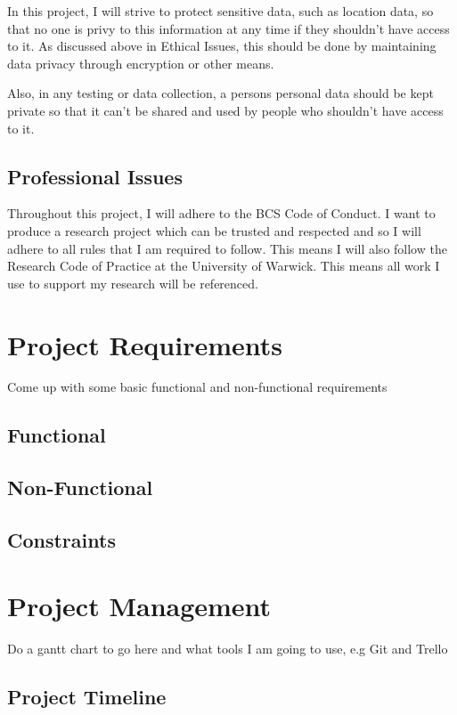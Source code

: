 \documentclass{report}
\begin{document}
In this project, I will strive to protect sensitive data, such as location data, so that no one is privy to this 
information at any time if they shouldn't have access to it. As discussed above in Ethical Issues, this should be 
done by maintaining data privacy through encryption or other means.

Also, in any testing or data collection, a persons personal data should be kept private so that it can't be shared 
and used by people who shouldn't have access to it.  

\section{Professional Issues}

Throughout this project, I will adhere to the BCS Code of Conduct\cite{BCSCoP}. I want to produce a 
research project which can be trusted and respected and so I will adhere to all rules that I am required 
to follow. This means I will also follow the Research Code of Practice at the University of Warwick\cite{UniWarwickCOP}. 
This means all work I use to support my research will be referenced. 

\chapter{Project Requirements}

Come up with some basic functional and non-functional requirements

\section{Functional}

\section{Non-Functional}

\section{Constraints}

\chapter{Project Management}

Do a gantt chart to go here and what tools I am going to use, e.g Git and Trello
\section{Project Timeline}
\end{document}

